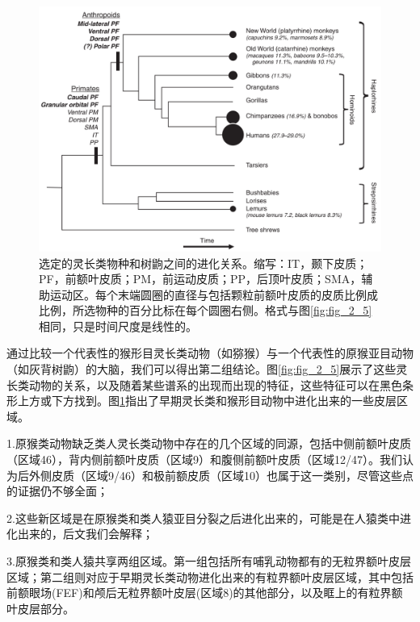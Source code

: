 \begin{figure}[!htb]
	\centering
	\includegraphics[width=0.8\linewidth]{image_pfc/Fig_2_6}
	\caption*{选定的灵长类物种和树鼩之间的进化关系。缩写：IT，颞下皮质；PF，前额叶皮质；PM，前运动皮质；PP，后顶叶皮质；SMA，辅助运动区。每个末端圆圈的直径与包括颗粒前额叶皮质的皮质比例成比例，所选物种的百分比标在每个圆圈右侧。格式与图\ref{fig:fig_2_5}相同，只是时间尺度是线性的。\label{fig:fig_2_6}}
\end{figure}

通过比较一个代表性的猴形目灵长类动物（如猕猴）与一个代表性的原猴亚目动物（如灰背树鼩）的大脑，我们可以得出第二组结论。图\ref{fig:fig_2_5}展示了这些灵长类动物的关系，以及随着某些谱系的出现而出现的特征，这些特征可以在黑色条形上方或下方找到。图\ref{fig:fig_2_6}指出了早期灵长类和猴形目动物中进化出来的一些皮层区域。\par
1.原猴类动物缺乏类人灵长类动物中存在的几个区域的同源，包括中侧前额叶皮质（区域46），背内侧前额叶皮质（区域9）和腹侧前额叶皮质（区域12/47）。我们认为后外侧皮质（区域9/46）和极前额皮质（区域10）也属于这一类别，尽管这些点的证据仍不够全面；\par
2.这些新区域是在原猴类和类人猿亚目分裂之后进化出来的，可能是在人猿类中进化出来的，后文我们会解释；\par
3.原猴类和类人猿共享两组区域。第一组包括所有哺乳动物都有的无粒界额叶皮层区域；第二组则对应于早期灵长类动物进化出来的有粒界额叶皮层区域，其中包括前额眼场(FEF)和颅后无粒界额叶皮层(区域8)的其他部分，以及眶上的有粒界额叶皮层部分。

